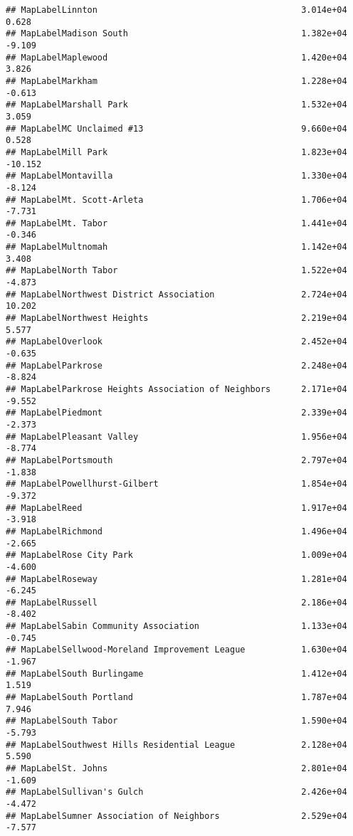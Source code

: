 \documentclass[]{article}
\begin{document}
\begin{verbatim}
## MapLabelLinnton                                        3.014e+04   0.628
## MapLabelMadison South                                  1.382e+04  -9.109
## MapLabelMaplewood                                      1.420e+04   3.826
## MapLabelMarkham                                        1.228e+04  -0.613
## MapLabelMarshall Park                                  1.532e+04   3.059
## MapLabelMC Unclaimed #13                               9.660e+04   0.528
## MapLabelMill Park                                      1.823e+04 -10.152
## MapLabelMontavilla                                     1.330e+04  -8.124
## MapLabelMt. Scott-Arleta                               1.706e+04  -7.731
## MapLabelMt. Tabor                                      1.441e+04  -0.346
## MapLabelMultnomah                                      1.142e+04   3.408
## MapLabelNorth Tabor                                    1.522e+04  -4.873
## MapLabelNorthwest District Association                 2.724e+04  10.202
## MapLabelNorthwest Heights                              2.219e+04   5.577
## MapLabelOverlook                                       2.452e+04  -0.635
## MapLabelParkrose                                       2.248e+04  -8.824
## MapLabelParkrose Heights Association of Neighbors      2.171e+04  -9.552
## MapLabelPiedmont                                       2.339e+04  -2.373
## MapLabelPleasant Valley                                1.956e+04  -8.774
## MapLabelPortsmouth                                     2.797e+04  -1.838
## MapLabelPowellhurst-Gilbert                            1.854e+04  -9.372
## MapLabelReed                                           1.917e+04  -3.918
## MapLabelRichmond                                       1.496e+04  -2.665
## MapLabelRose City Park                                 1.009e+04  -4.600
## MapLabelRoseway                                        1.281e+04  -6.245
## MapLabelRussell                                        2.186e+04  -8.402
## MapLabelSabin Community Association                    1.133e+04  -0.745
## MapLabelSellwood-Moreland Improvement League           1.630e+04  -1.967
## MapLabelSouth Burlingame                               1.412e+04   1.519
## MapLabelSouth Portland                                 1.787e+04   7.946
## MapLabelSouth Tabor                                    1.590e+04  -5.793
## MapLabelSouthwest Hills Residential League             2.128e+04   5.590
## MapLabelSt. Johns                                      2.801e+04  -1.609
## MapLabelSullivan's Gulch                               2.426e+04  -4.472
## MapLabelSumner Association of Neighbors                2.529e+04  -7.577

\end{verbatim}
\end{document}
